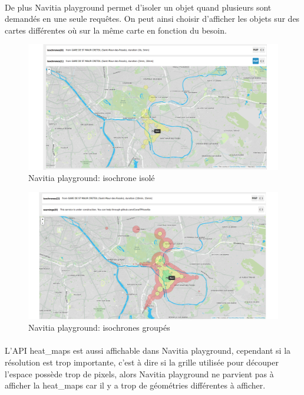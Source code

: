 \documentclass[a4paper]{report}
\begin{document}
\paragraph{} De plus Navitia playground permet d'isoler un objet quand plusieurs sont demandés en une seule requêtes. On peut ainsi choisir d'afficher les objets sur des cartes différentes où sur la même carte en fonction du besoin.

\begin{figure}[H]
	\begin{center}
		\includegraphics[width=400pt]{image/n_p_iso}
		\caption{Navitia playground: isochrone isolé}
		\label{Navitia playground: isochrone isolé}
	\end{center}
\end{figure}

\begin{figure}[H]
	\begin{center}
		\includegraphics[width=400pt]{image/n_p_isochrone}
		\caption{Navitia playground: isochrones groupés}
		\label{Navitia playground: isochrones groupés}
	\end{center}
\end{figure}

\paragraph{}L'API heat\_maps est aussi affichable dans Navitia playground, cependant si la résolution est trop importante, c'est à dire si la grille utilisée pour découper l'espace possède trop de pixels, alors Navitia playground ne parvient pas à afficher la heat\_maps car il y a trop de géométries différentes à afficher.
\end{document}
